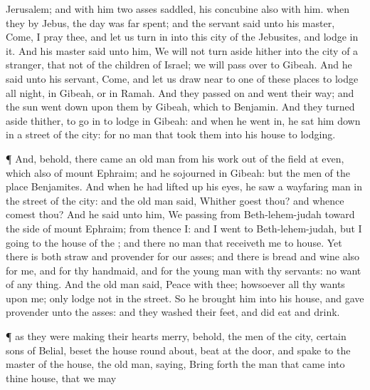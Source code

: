 {{}
Jerusalem; and
{} with him
two
asses
saddled, his
concubine also
{} with him.
 when they
{} by
Jebus, the
day was
far
spent; and the
servant
said unto his
master,
Come, I pray thee, and let us turn
in into this
city of the
Jebusites, and
lodge in it.
And his
master
said unto him, We will not turn
aside hither into the
city of a
stranger, that
{} not of the
children of
Israel; we will pass
over to
Gibeah.
And he
said unto his
servant,
Come, and let us draw
near to
one of these
places to lodge all
night, in
Gibeah, or in
Ramah.
And they passed
on and went their
way; and the
sun went
down upon them
{}
by
Gibeah, which
{} to
Benjamin.
And they turned
aside thither, to go
in
{} to
lodge in
Gibeah: and when he went
in, he sat him
down in a
street of the
city: for
{} no
man that
took them into his
house to
lodging.
\par }{\PP {}¶ And, behold, there
came an
old
man from his
work out of the
field at
even, which
{}
also of
mount
Ephraim; and he
sojourned in
Gibeah: but the
men of the
place
{}
Benjamites.
And when he had lifted
up his
eyes, he
saw a
wayfaring
man in the
street of the
city: and the
old
man
said, Whither
goest thou? and
whence
comest thou?
And he
said unto him, We
{}
passing from
Beth-lehem-judah toward the
side of
mount
Ephraim; from thence
{} I: and I
went to
Beth-lehem-judah, but I
{}
going to the
house of the
{}; and there
{} no
man that
receiveth me to
house.
Yet there
is both
straw and
provender for our
asses; and there is
bread and
wine also for me, and for thy
handmaid, and for the young
man
{} with thy
servants:
{} no
want of any
thing.
And the
old
man
said,
Peace
{} with thee;
howsoever
{} all thy
wants
{} upon me; only
lodge not in the
street.
So he
brought him into his
house, and gave
provender unto the
asses: and they
washed their
feet, and did
eat and
drink.
\par }{\PP {}¶
{} as they were making their
hearts
merry, behold, the
men of the
city,
certain
sons of
Belial,
beset the
house round
about,
{}
beat at the
door, and
spake to the
master of the
house, the
old
man,
saying, Bring
forth the
man that
came into thine
house, that we may
}
